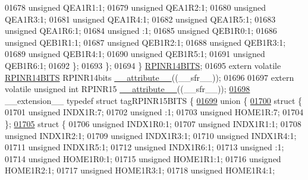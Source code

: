 \begin{DoxyCode}
01678       \textcolor{keywordtype}{unsigned} QEA1R1:1;
01679       \textcolor{keywordtype}{unsigned} QEA1R2:1;
01680       \textcolor{keywordtype}{unsigned} QEA1R3:1;
01681       \textcolor{keywordtype}{unsigned} QEA1R4:1;
01682       \textcolor{keywordtype}{unsigned} QEA1R5:1;
01683       \textcolor{keywordtype}{unsigned} QEA1R6:1;
01684       \textcolor{keywordtype}{unsigned} :1;
01685       \textcolor{keywordtype}{unsigned} QEB1R0:1;
01686       \textcolor{keywordtype}{unsigned} QEB1R1:1;
01687       \textcolor{keywordtype}{unsigned} QEB1R2:1;
01688       \textcolor{keywordtype}{unsigned} QEB1R3:1;
01689       \textcolor{keywordtype}{unsigned} QEB1R4:1;
01690       \textcolor{keywordtype}{unsigned} QEB1R5:1;
01691       \textcolor{keywordtype}{unsigned} QEB1R6:1;
01692     \};
01693   \};
01694 \} \hyperlink{a00008_d2/d74/a00697}{RPINR14BITS};
01695 \textcolor{keyword}{extern} \textcolor{keyword}{volatile} \hyperlink{a00008_d2/d74/a00697}{RPINR14BITS} RPINR14bits \hyperlink{a00009_a493c46f03454991ccc5aa7a6e1dfb2a7}{\_\_attribute\_\_}((\_\_sfr\_\_));
01696 
01697 \textcolor{keyword}{extern} \textcolor{keyword}{volatile} \textcolor{keywordtype}{unsigned} \textcolor{keywordtype}{int}  RPINR15 \hyperlink{a00009_a493c46f03454991ccc5aa7a6e1dfb2a7}{\_\_attribute\_\_}((\_\_sfr\_\_));
\hypertarget{a00009_source_l01698}{}\hyperlink{a00008}{01698} \_\_extension\_\_ \textcolor{keyword}{typedef} \textcolor{keyword}{struct }tagRPINR15BITS \{
\hypertarget{a00009_source_l01699}{}\hyperlink{a00009}{01699}   \textcolor{keyword}{union }\{
\hypertarget{a00009_source_l01700}{}\hyperlink{a00009}{01700}     \textcolor{keyword}{struct }\{
01701       \textcolor{keywordtype}{unsigned} INDX1R:7;
01702       \textcolor{keywordtype}{unsigned} :1;
01703       \textcolor{keywordtype}{unsigned} HOME1R:7;
01704     \};
\hypertarget{a00009_source_l01705}{}\hyperlink{a00009}{01705}     \textcolor{keyword}{struct }\{
01706       \textcolor{keywordtype}{unsigned} INDX1R0:1;
01707       \textcolor{keywordtype}{unsigned} INDX1R1:1;
01708       \textcolor{keywordtype}{unsigned} INDX1R2:1;
01709       \textcolor{keywordtype}{unsigned} INDX1R3:1;
01710       \textcolor{keywordtype}{unsigned} INDX1R4:1;
01711       \textcolor{keywordtype}{unsigned} INDX1R5:1;
01712       \textcolor{keywordtype}{unsigned} INDX1R6:1;
01713       \textcolor{keywordtype}{unsigned} :1;
01714       \textcolor{keywordtype}{unsigned} HOME1R0:1;
01715       \textcolor{keywordtype}{unsigned} HOME1R1:1;
01716       \textcolor{keywordtype}{unsigned} HOME1R2:1;
01717       \textcolor{keywordtype}{unsigned} HOME1R3:1;
01718       \textcolor{keywordtype}{unsigned} HOME1R4:1;

\end{DoxyCode}
